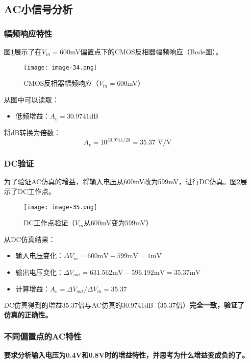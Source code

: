 \documentclass[UTF8,12pt,a4paper]{ctexart}
\begin{document}
\subsection{AC小信号分析}

\subsubsection{幅频响应特性}
图\ref{fig:task10a}展示了在$V_{in} = 600$mV偏置点下的CMOS反相器幅频响应（Bode图）。

\begin{figure}[h]
\centering
\texttt{[image: image-34.png]}
\caption{CMOS反相器幅频响应（$V_{in} = 600$mV）}
\label{fig:task10a}
\end{figure}

从图中可以读取：
\begin{itemize}
\item 低频增益：$A_v = 30.9741$dB
\end{itemize}

将dB转换为倍数：
\begin{equation}
A_v = 10^{30.9741/20} = 35.37\text{ V/V}
\end{equation}

\subsubsection{DC验证}
为了验证AC仿真的增益，将输入电压从600mV改为599mV，进行DC仿真。图\ref{fig:task10b}展示了DC工作点。

\begin{figure}[h]
\centering
\texttt{[image: image-35.png]}
\caption{DC工作点验证（$V_{in}$从600mV变为599mV）}
\label{fig:task10b}
\end{figure}

从DC仿真结果：
\begin{itemize}
\item 输入电压变化：$\Delta V_{in} = 600\text{mV} - 599\text{mV} = 1\text{mV}$
\item 输出电压变化：$\Delta V_{out} = 631.562\text{mV} - 596.192\text{mV} = 35.37\text{mV}$
\item 计算增益：$A_v = \Delta V_{out}/\Delta V_{in} = 35.37$
\end{itemize}

DC仿真得到的增益35.37倍与AC仿真的30.9741dB（35.37倍）\textbf{完全一致，验证了仿真的正确性。}

\subsubsection{不同偏置点的AC特性}
\textbf{要求分析输入电压为0.4V和0.8V时的增益特性，并思考为什么增益变成负的了。}
\end{document}
